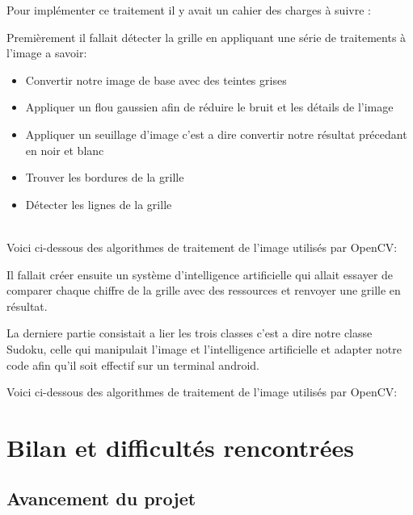 \documentclass{article}
\begin{document}
Pour implémenter ce traitement il y avait un cahier des charges à suivre :

Premièrement il fallait détecter la grille en appliquant une série de traitements à l'image a savoir:
\begin{itemize}
    \item Convertir notre image de base avec des teintes grises
    \item Appliquer un flou gaussien afin de réduire le bruit et les détails de l'image
    \item Appliquer un seuillage d'image c'est a dire convertir notre résultat précedant en noir et blanc
    \item Trouver les bordures de la grille
    \item Détecter les lignes de la grille
\end{itemize}\\

Voici ci-dessous des algorithmes de traitement de l'image utilisés par OpenCV:

Il fallait créer ensuite un système d'intelligence artificielle qui  allait essayer de comparer chaque chiffre de la grille avec des ressources et renvoyer une grille en résultat.

La derniere partie consistait a lier les trois classes c'est a dire notre classe Sudoku, celle qui manipulait l'image et l'intelligence artificielle et adapter notre code afin qu'il soit effectif sur un terminal android.

Voici ci-dessous des algorithmes de traitement de l'image utilisés par OpenCV:



\newpage
\section{Bilan et difficultés rencontrées}

\subsection{Avancement du projet}
\end{document}
